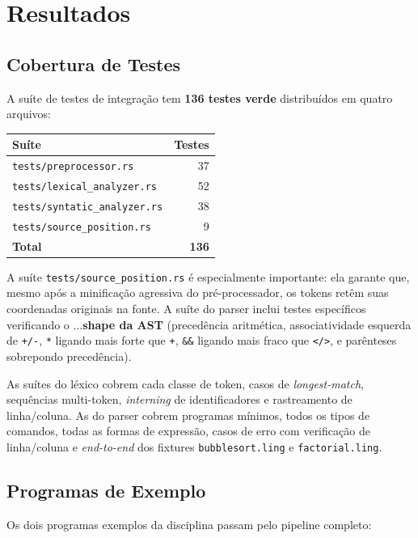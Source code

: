 \documentclass[12pt,a4paper]{article}
\begin{document}
\section{Resultados}

\subsection{Cobertura de Testes}

A suíte de testes de integração tem \textbf{136 testes verde}
distribuídos em quatro arquivos:

\begin{center}
\begin{tabular}{l|r}
\textbf{Suíte} & \textbf{Testes} \\ \hline
\texttt{tests/preprocessor.rs} & 37 \\
\texttt{tests/lexical\_analyzer.rs} & 52 \\
\texttt{tests/syntatic\_analyzer.rs} & 38 \\
\texttt{tests/source\_position.rs} & 9 \\
\hline
\textbf{Total} & \textbf{136} \\
\end{tabular}
\end{center}

\noindent A suíte \texttt{tests/source\_position.rs} é especialmente
importante: ela garante que, mesmo após a minificação agressiva do
pré-processador, os tokens retêm suas coordenadas originais na fonte.
A suíte do parser inclui testes específicos verificando o
...\textbf{shape da AST} (precedência aritmética, associatividade
esquerda de \texttt{+/-}, \texttt{*} ligando mais forte que
\texttt{+}, \texttt{\&\&} ligando mais fraco que \texttt{</>}, e
parênteses sobrepondo precedência).

\noindent As suítes do léxico cobrem cada classe de token, casos de
\emph{longest-match}, sequências multi-token, \emph{interning} de
identificadores e rastreamento de linha/coluna. As do parser cobrem
programas mínimos, todos os tipos de comandos, todas as formas de
expressão, casos de erro com verificação de linha/coluna e
\emph{end-to-end} dos fixtures \texttt{bubblesort.ling} e
\texttt{factorial.ling}.

\subsection{Programas de Exemplo}

Os dois programas exemplos da disciplina passam pelo pipeline
completo:
\end{document}
